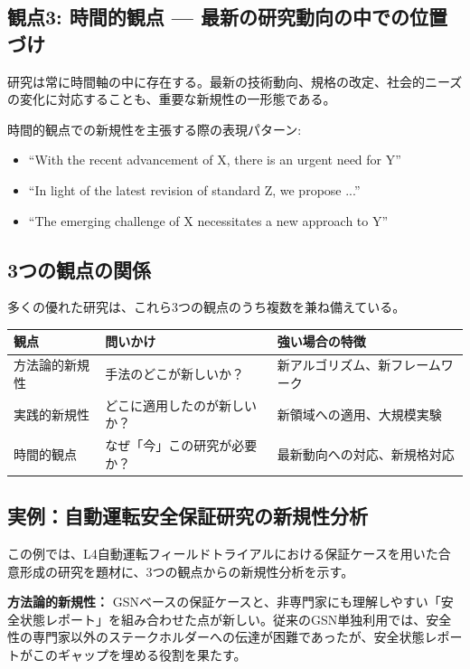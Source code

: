 \subsection{観点3: 時間的観点 --- 最新の研究動向の中での位置づけ}

研究は常に時間軸の中に存在する。最新の技術動向、規格の改定、社会的ニーズの変化に対応することも、重要な新規性の一形態である。

時間的観点での新規性を主張する際の表現パターン:
\begin{itemize}
\item ``With the recent advancement of X, there is an urgent need for Y''
\item ``In light of the latest revision of standard Z, we propose ...''
\item ``The emerging challenge of X necessitates a new approach to Y''
\end{itemize}

\subsection*{3つの観点の関係}

多くの優れた研究は、これら3つの観点のうち複数を兼ね備えている。

\begin{table}[H]
\centering
\small
\footnotesize
\begin{tabular}{lp{3.5cm}p{3.5cm}}
\toprule
観点 & 問いかけ & 強い場合の特徴 \\
\midrule
方法論的新規性 & 手法のどこが新しいか？ & 新アルゴリズム、新フレームワーク \\
実践的新規性 & どこに適用したのが新しいか？ & 新領域への適用、大規模実験 \\
時間的観点 & なぜ「今」この研究が必要か？ & 最新動向への対応、新規格対応 \\
\bottomrule
\end{tabular}
\end{table}

\subsection{実例：自動運転安全保証研究の新規性分析}

この例では、L4自動運転フィールドトライアルにおける保証ケースを用いた合意形成の研究を題材に、3つの観点からの新規性分析を示す。

\textbf{方法論的新規性：}
GSNベースの保証ケースと、非専門家にも理解しやすい「安全状態レポート」を組み合わせた点が新しい。従来のGSN単独利用では、安全性の専門家以外のステークホルダーへの伝達が困難であったが、安全状態レポートがこのギャップを埋める役割を果たす。

